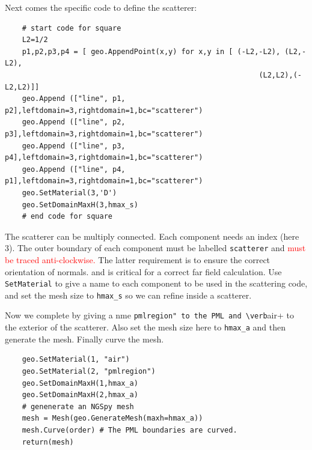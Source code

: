 \documentclass[12pt]{article}
\begin{document}
Next comes the specific code to define the scatterer:
\begin{verbatim}
    # start code for square
    L2=1/2
    p1,p2,p3,p4 = [ geo.AppendPoint(x,y) for x,y in [ (-L2,-L2), (L2,-L2),
                                                           (L2,L2),(-L2,L2)]]
    geo.Append (["line", p1, p2],leftdomain=3,rightdomain=1,bc="scatterer")
    geo.Append (["line", p2, p3],leftdomain=3,rightdomain=1,bc="scatterer")
    geo.Append (["line", p3, p4],leftdomain=3,rightdomain=1,bc="scatterer")
    geo.Append (["line", p4, p1],leftdomain=3,rightdomain=1,bc="scatterer")
    geo.SetMaterial(3,'D')
    geo.SetDomainMaxH(3,hmax_s)
    # end code for square
\end{verbatim}
The scatterer can be multiply connected.  Each component needs an index (here 3). The outer boundary of each component must be labelled \verb+scatterer+ and \textcolor{red}{must be traced anti-clockwise.} The latter requirement is to ensure the correct orientation of normals. and is critical for a correct far field calculation. Use \verb+SetMaterial+ to give a name to each component to be used in the scattering code, and set the mesh size to \verb+hmax_s+ so we can refine inside a scatterer.

Now we complete by giving a nme \verb+pmlregion" to the PML and \verb+air+ to the exterior of the scatterer.  Also set the mesh size here to \verb+hmax_a+ and then generate the mesh.  Finally curve the mesh.
\begin{verbatim}
    geo.SetMaterial(1, "air")
    geo.SetMaterial(2, "pmlregion")
    geo.SetDomainMaxH(1,hmax_a)
    geo.SetDomainMaxH(2,hmax_a)
    # genenerate an NGSpy mesh
    mesh = Mesh(geo.GenerateMesh(maxh=hmax_a))
    mesh.Curve(order) # The PML boundaries are curved.
    return(mesh)
\end{verbatim}
\end{document}

